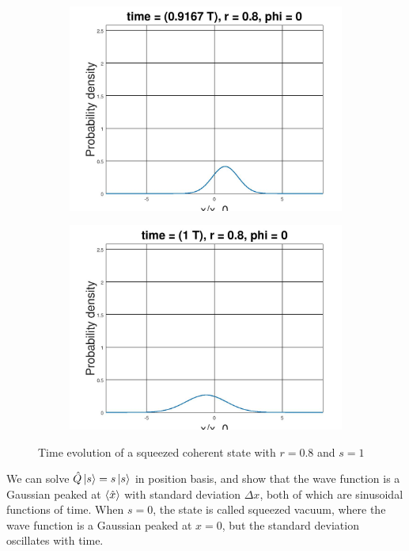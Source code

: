 \documentclass[12pt, twoside]{article}
\begin{document}
\begin{figure}[h!]
\begin{subfigure}[h!]{0.3\linewidth}
	\end{subfigure}
	\begin{subfigure}[h!]{0.3\linewidth}
		\includegraphics[width=\linewidth]{graphs/squeeze_0.8/11.jpg}
	\end{subfigure}
	\begin{subfigure}[h!]{0.3\linewidth}
		\includegraphics[width=\linewidth]{graphs/squeeze_0.8/12.jpg}
	\end{subfigure}
	\caption{Time evolution of a squeezed coherent state with $r=0.8$ and $s=1$}
\end{figure}
We can solve $\hat{Q}\ket{s} = s\ket{s}$ in position basis, and show that the wave function is a Gaussian peaked at $\expval{\hat{x}}$ with standard deviation $\Delta x$, both of which are sinusoidal functions of time. When $s=0$, the state is called squeezed vacuum, where the wave function is a Gaussian peaked at $x=0$, but the standard deviation oscillates with time.
\end{document}

